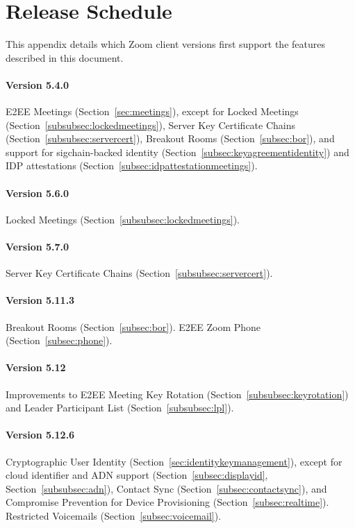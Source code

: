 \section{Release Schedule}
\label{appendix:releases}
This appendix details which Zoom client versions first support the features described in this
document.

\paragraph{Version 5.4.0}
E2EE Meetings (Section~\ref{sec:meetings}), except for Locked Meetings
(Section~\ref{subsubsec:lockedmeetings}), Server Key Certificate Chains
(Section~\ref{subsubsec:servercert}), Breakout Rooms (Section~\ref{subsec:bor}), and support for
sigchain-backed identity (Section~\ref{subsec:keyagreementidentity}) and IDP attestations
(Section~\ref{subsec:idpattestationmeetings}).

\paragraph{Version 5.6.0}
Locked Meetings (Section~\ref{subsubsec:lockedmeetings}).

\paragraph{Version 5.7.0}
Server Key Certificate Chains (Section~\ref{subsubsec:servercert}).

\paragraph{Version 5.11.3}
Breakout Rooms (Section~\ref{subsec:bor}). E2EE Zoom Phone (Section~\ref{subsec:phone}).

\paragraph{Version 5.12}
Improvements to E2EE Meeting Key Rotation (Section~\ref{subsubsec:keyrotation}) and Leader
Participant List (Section~\ref{subsubsec:lpl}).

\paragraph{Version 5.12.6}
Cryptographic User Identity (Section~\ref{sec:identitykeymanagement}), except for cloud identifier
and ADN support (Section~\ref{subsec:displayid}, Section~\ref{subsubsec:adn}), Contact Sync
(Section~\ref{subsec:contactsync}), and Compromise Prevention for Device Provisioning
(Section~\ref{subsec:realtime}). Restricted Voicemails (Section~\ref{subsec:voicemail}).

